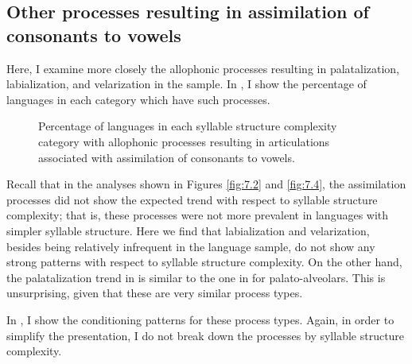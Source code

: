 \subsection{Other processes resulting in assimilation of consonants to vowels}\label{sec:7.3.3}

  Here, I examine more closely the allophonic processes resulting in palatalization, labialization, and velarization in the sample. In , I show the percentage of languages in each category which have such processes.

\begin{figure}
\caption{\label{fig:7.7}Percentage of languages in each syllable structure complexity category with allophonic processes resulting in articulations associated with assimilation of consonants to vowels.}
\end{figure}
  Recall that in the analyses shown in Figures \ref{fig:7.2} and \ref{fig:7.4}, the assimilation processes did not show the expected trend with respect to syllable structure complexity; that is, these processes were not more prevalent in languages with simpler syllable structure. Here we find that labialization and velarization, besides being relatively infrequent in the language sample, do not show any strong patterns with respect to syllable structure complexity. On the other hand, the palatalization trend in  is similar to the one in  for palato-alveolars. This is unsurprising, given that these are very similar process types.

  In , I show the conditioning patterns for these process types. Again, in order to simplify the presentation, I do not break down the processes by syllable structure complexity.

